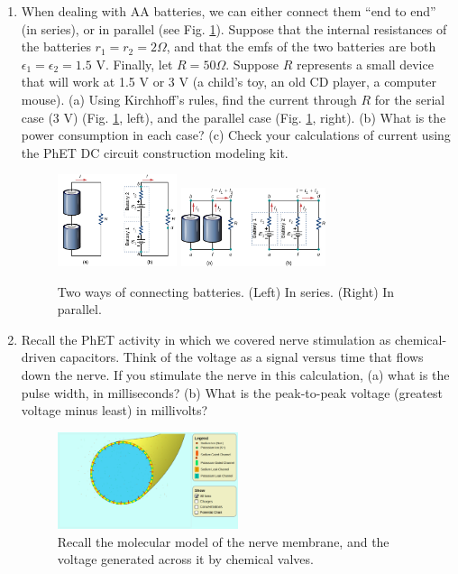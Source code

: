 \documentclass[10pt]{article}
\begin{document}
\begin{enumerate}

\item When dealing with AA batteries, we can either connect them ``end to end'' (in series), or in parallel (see Fig. \ref{fig:ohm1}).  Suppose that the internal resistances of the batteries $r_1 = r_2 = 2 \Omega$, and that the emfs of the two batteries are both $\epsilon_1 = \epsilon_2 = 1.5$ V.  Finally, let $R = 50 \Omega$.  Suppose $R$ represents a small device that will work at 1.5 V or 3 V (a child's toy, an old CD player, a computer mouse).  (a) Using Kirchhoff's rules, find the current through $R$ for the serial case (3 V) (Fig. \ref{fig:ohm1}, left), and the parallel case (Fig. \ref{fig:ohm1}, right).  (b) What is the power consumption in each case?  (c) Check your calculations of current using the PhET DC circuit construction modeling kit.

\begin{figure}[hb]
\centering
\includegraphics[width=0.33\textwidth]{figures/ohm2.png} \hspace{1cm}
\includegraphics[width=0.4\textwidth]{figures/battery2.jpeg}
\caption{\label{fig:ohm1} Two ways of connecting batteries.  (Left) In series. (Right) In parallel.}
\end{figure}

\item Recall the PhET activity in which we covered nerve stimulation as chemical-driven capacitors.  Think of the voltage as a signal versus time that flows down the nerve.  If you stimulate the nerve in this calculation, (a) what is the pulse width, in milliseconds?  (b) What is the peak-to-peak voltage (greatest voltage minus least) in millivolts?

\begin{figure}[hb]
\centering
\includegraphics[width=0.5\textwidth]{figures/neuron.png}
\caption{\label{fig:neuron} Recall the molecular model of the nerve membrane, and the voltage generated across it by chemical valves.}
\end{figure}

\end{enumerate}
\end{document}
